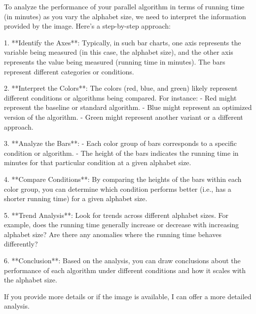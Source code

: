 To analyze the performance of your parallel algorithm in terms of running time (in minutes) as you vary the alphabet size, we need to interpret the information provided by the image. Here's a step-by-step approach:

1. **Identify the Axes**: Typically, in such bar charts, one axis represents the variable being measured (in this case, the alphabet size), and the other axis represents the value being measured (running time in minutes). The bars represent different categories or conditions.

2. **Interpret the Colors**: The colors (red, blue, and green) likely represent different conditions or algorithms being compared. For instance:
   - Red might represent the baseline or standard algorithm.
   - Blue might represent an optimized version of the algorithm.
   - Green might represent another variant or a different approach.

3. **Analyze the Bars**:
   - Each color group of bars corresponds to a specific condition or algorithm.
   - The height of the bars indicates the running time in minutes for that particular condition at a given alphabet size.

4. **Compare Conditions**: By comparing the heights of the bars within each color group, you can determine which condition performs better (i.e., has a shorter running time) for a given alphabet size.

5. **Trend Analysis**: Look for trends across different alphabet sizes. For example, does the running time generally increase or decrease with increasing alphabet size? Are there any anomalies where the running time behaves differently?

6. **Conclusion**: Based on the analysis, you can draw conclusions about the performance of each algorithm under different conditions and how it scales with the alphabet size.

If you provide more details or if the image is available, I can offer a more detailed analysis.